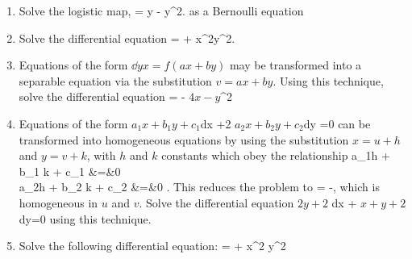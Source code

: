 \documentclass[12pt]{book}
\begin{document}
\begin{enumerate}
\item 
Solve the logistic map,
\bee
{} = y - y^2.
\eee
as a Bernoulli equation

\item
Solve the differential equation
\bee
{} =  + x^2y^2.
\eee
{}

\item
  Equations of the form $\dd{y}{x} = f(ax+by)$ may be transformed into a 
  separable equation via the substitution  $v=ax + by$. Using this technique,
  solve the differential equation
  \bee 
   = - \(4x -y\)^2
  \eee

\item
  Equations of the form
  \bee
  \(a_1 x + b_1 y + c_1\)dx +2 \(a_2 x + b_2 y + c_2\)dy =0
  \eee
  can be transformed into homogeneous equations by using the substitution
  $x=u+h$ and $y=v+k$, with $h$ and $k$ constants which obey the relationship
  \bee
  a_1h + b_1 k + c_1 &=&0 \\ 
  a_2h + b_2 k + c_2 &=&0 .
  \eee
  This reduces the problem to 
  \bee
   = -,
  \eee
  which is homogeneous in $u$ and $v$.
  Solve the differential equation
  \bee
  \(2y + 2\) dx + \(x +y+2\) dy=0
  \eee
  using this technique.
  

  
  \item
    Solve the following differential equation:
    \bee
     =  + x^2 y^2
    \eee

\end{enumerate}
\end{document}
